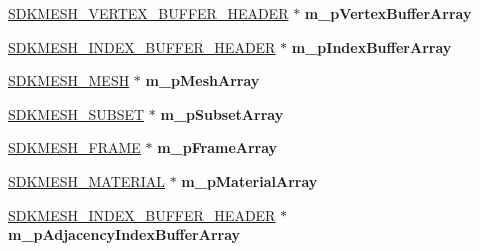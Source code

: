 \begin{DoxyCompactItemize}
\item 
\hypertarget{class_c_d_x_u_t_s_d_k_mesh_a560f9a4f6ce665b8ea18a80f4a2f4067}{\hyperlink{struct_s_d_k_m_e_s_h___v_e_r_t_e_x___b_u_f_f_e_r___h_e_a_d_e_r}{S\+D\+K\+M\+E\+S\+H\+\_\+\+V\+E\+R\+T\+E\+X\+\_\+\+B\+U\+F\+F\+E\+R\+\_\+\+H\+E\+A\+D\+E\+R} $\ast$ {\bfseries m\+\_\+p\+Vertex\+Buffer\+Array}}\label{class_c_d_x_u_t_s_d_k_mesh_a560f9a4f6ce665b8ea18a80f4a2f4067}

\item 
\hypertarget{class_c_d_x_u_t_s_d_k_mesh_a1b2bbbbad30a07ed98a041abb49fe160}{\hyperlink{struct_s_d_k_m_e_s_h___i_n_d_e_x___b_u_f_f_e_r___h_e_a_d_e_r}{S\+D\+K\+M\+E\+S\+H\+\_\+\+I\+N\+D\+E\+X\+\_\+\+B\+U\+F\+F\+E\+R\+\_\+\+H\+E\+A\+D\+E\+R} $\ast$ {\bfseries m\+\_\+p\+Index\+Buffer\+Array}}\label{class_c_d_x_u_t_s_d_k_mesh_a1b2bbbbad30a07ed98a041abb49fe160}

\item 
\hypertarget{class_c_d_x_u_t_s_d_k_mesh_afd34eb8a05ebe80eb4a1d52c21d28e5c}{\hyperlink{struct_s_d_k_m_e_s_h___m_e_s_h}{S\+D\+K\+M\+E\+S\+H\+\_\+\+M\+E\+S\+H} $\ast$ {\bfseries m\+\_\+p\+Mesh\+Array}}\label{class_c_d_x_u_t_s_d_k_mesh_afd34eb8a05ebe80eb4a1d52c21d28e5c}

\item 
\hypertarget{class_c_d_x_u_t_s_d_k_mesh_ad552a3034ff3532f074a7bf4c1eb10a7}{\hyperlink{struct_s_d_k_m_e_s_h___s_u_b_s_e_t}{S\+D\+K\+M\+E\+S\+H\+\_\+\+S\+U\+B\+S\+E\+T} $\ast$ {\bfseries m\+\_\+p\+Subset\+Array}}\label{class_c_d_x_u_t_s_d_k_mesh_ad552a3034ff3532f074a7bf4c1eb10a7}

\item 
\hypertarget{class_c_d_x_u_t_s_d_k_mesh_a1bd28255ce0777fa91ec9ddc9c530fdd}{\hyperlink{struct_s_d_k_m_e_s_h___f_r_a_m_e}{S\+D\+K\+M\+E\+S\+H\+\_\+\+F\+R\+A\+M\+E} $\ast$ {\bfseries m\+\_\+p\+Frame\+Array}}\label{class_c_d_x_u_t_s_d_k_mesh_a1bd28255ce0777fa91ec9ddc9c530fdd}

\item 
\hypertarget{class_c_d_x_u_t_s_d_k_mesh_a070be7d7330a6cecc3a86fbbb537bf31}{\hyperlink{struct_s_d_k_m_e_s_h___m_a_t_e_r_i_a_l}{S\+D\+K\+M\+E\+S\+H\+\_\+\+M\+A\+T\+E\+R\+I\+A\+L} $\ast$ {\bfseries m\+\_\+p\+Material\+Array}}\label{class_c_d_x_u_t_s_d_k_mesh_a070be7d7330a6cecc3a86fbbb537bf31}

\item 
\hypertarget{class_c_d_x_u_t_s_d_k_mesh_a42976c22fca107b58d9fddc055f7bf12}{\hyperlink{struct_s_d_k_m_e_s_h___i_n_d_e_x___b_u_f_f_e_r___h_e_a_d_e_r}{S\+D\+K\+M\+E\+S\+H\+\_\+\+I\+N\+D\+E\+X\+\_\+\+B\+U\+F\+F\+E\+R\+\_\+\+H\+E\+A\+D\+E\+R} $\ast$ {\bfseries m\+\_\+p\+Adjacency\+Index\+Buffer\+Array}}\label{class_c_d_x_u_t_s_d_k_mesh_a42976c22fca107b58d9fddc055f7bf12}


\end{DoxyCompactItemize}
